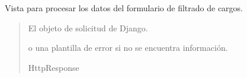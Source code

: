 \documentclass[letterpaper,10pt,spanish]{sphinxmanual}
\begin{document}
\begin{fulllineitems}

\pysigstartsignatures
{}
\pysigstopsignatures
\end{fulllineitems}



\begin{fulllineitems}

\pysigstartsignatures
{}
\pysigstopsignatures
\sphinxAtStartPar
Vista para procesar los datos del formulario de filtrado de cargos.
\begin{quote}\begin{description}
\sphinxAtStartPar
{} \textendash{} El objeto de solicitud de Django.

\sphinxAtStartPar
\begin{description}
\sphinxAtStartPar
o una plantilla de error si no se encuentra información.

\end{description}


\sphinxAtStartPar
HttpResponse

\end{description}\end{quote}

\end{fulllineitems}
\end{document}
